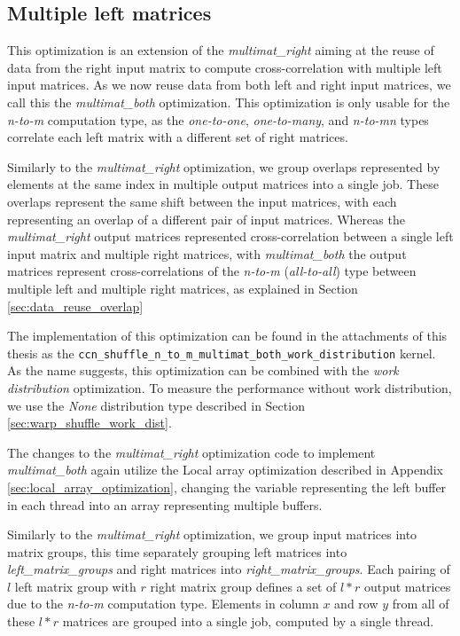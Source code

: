 
\subsection{Multiple left matrices}
\label{sec:multimat_both}

This optimization is an extension of the \textit{multimat\_right} aiming at the reuse of data from the right input matrix to compute cross-correlation with multiple left input matrices. As we now reuse data from both left and right input matrices, we call this the \textit{multimat\_both} optimization. This optimization is only usable for the \textit{n-to-m} computation type, as the \textit{one-to-one}, \textit{one-to-many}, and \textit{n-to-mn} types correlate each left matrix with a different set of right matrices.

Similarly to the \textit{multimat\_right} optimization, we group overlaps represented by elements at the same index in multiple output matrices into a single job. These overlaps represent the same shift between the input matrices, with each representing an overlap of a different pair of input matrices. Whereas the \textit{multimat\_right} output matrices represented cross-correlation between a single left input matrix and multiple right matrices, with \textit{multimat\_both} the output matrices represent cross-correlations of the \textit{n-to-m} (\textit{all-to-all}) type between multiple left and multiple right matrices, as explained in Section \ref{sec:data_reuse_overlap}

The implementation of this optimization can be found in the attachments of this thesis as the  \texttt{ccn\_shuffle\_n\_to\_m\_multimat\_both\_work\_distribution} kernel. As the name suggests, this optimization can be combined with the \textit{work distribution} optimization. To measure the performance without work distribution, we use the \textit{None} distribution type described in Section \ref{sec:warp_shuffle_work_dist}.


The changes to the \textit{multimat\_right} optimization code to implement \textit{multimat\_both} again utilize the Local array optimization described in Appendix \ref{sec:local_array_optimization}, changing the variable representing the left buffer in each thread into an array representing multiple buffers. 


Similarly to the \textit{multimat\_right} optimization, we group input matrices into matrix groups, this time separately grouping left matrices into \textit{left\_matrix\_groups} and right matrices into \textit{right\_matrix\_groups}. Each pairing of $l$ left matrix group with $r$ right matrix group defines a set of $l*r$ output matrices due to the \textit{n-to-m} computation type. Elements in column $x$ and row $y$ from all of these $l*r$ matrices are grouped into a single job, computed by a single thread. 

